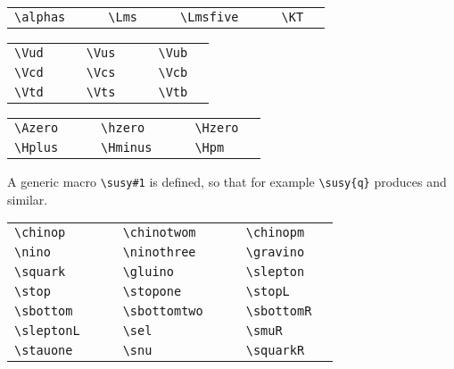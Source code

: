 \documentclass{../atlasnote}
\begin{document}
\medskip

\begin{tabular}{llcllcllcll}
  \verb+\alphas+ & \alphas{} & \hspace{1cm} &
  \verb+\Lms+ & \Lms{} & \hspace{1cm} &
  \verb+\Lmsfive+ & \Lmsfive{} & \hspace{1cm} &
  \verb+\KT+ & \KT{} \\
\end{tabular}

\medskip

\begin{tabular}{llcllcll}
  \verb+\Vud+ & \Vud{} & \hspace{1cm} &
  \verb+\Vus+ & \Vus{} & \hspace{1cm} &
  \verb+\Vub+ & \Vub{} \\
  \verb+\Vcd+ & \Vcd{} &  &
  \verb+\Vcs+ & \Vcs{} &  &
  \verb+\Vcb+ & \Vcb{} \\
  \verb+\Vtd+ & \Vtd{} & &
  \verb+\Vts+ & \Vts{} & & 
  \verb+\Vtb+ & \Vtb{} \\
\end{tabular}

\medskip

\begin{tabular}{llcllcll}
  \verb+\Azero+ & \Azero{} & \hspace{1cm} &
  \verb+\hzero+ & \hzero{} & \hspace{1cm} &
  \verb+\Hzero+ & \Hzero{} \\
  \verb+\Hplus+ & \Hplus{} & &
  \verb+\Hminus+ & \Hminus{} & &
  \verb+\Hpm+ & \Hpm{} \\
\end{tabular}

\medskip

\noindent A generic macro \verb+\susy#1+ is defined, so that for
example \verb+\susy{q}+ produces  and similar.

\medskip

\begin{tabular}{llcllcll}
  \verb+\chinop+ & \chinop{} & \hspace{1cm} &
  \verb+\chinotwom+ & \chinotwom{} & \hspace{1cm} &
  \verb+\chinopm+ & \chinopm{} \\
  \verb+\nino+ & \nino{} & &
  \verb+\ninothree+ & \ninothree{} & &
  \verb+\gravino+ & \gravino{} \\
  \verb+\squark+ & \squark{} & &
  \verb+\gluino+ & \gluino{} & &
  \verb+\slepton+ & \slepton{} \\
  \verb+\stop+ & \stop{} & &
  \verb+\stopone+ & \stopone{} & &
  \verb+\stopL+ & \stopL{} \\
  \verb+\sbottom+ & \sbottom{} & &
  \verb+\sbottomtwo+ & \sbottomtwo{} & &
  \verb+\sbottomR+ & \sbottomR{} \\
  \verb+\sleptonL+ & \sleptonL{} & &
  \verb+\sel+ & \sel{} & &
  \verb+\smuR+ & \smuR{} \\
  \verb+\stauone+ & \stauone{} & &
  \verb+\snu+ & \snu{} & &
  \verb+\squarkR+ & \squarkR{} \\
\end{tabular}
\end{document}
